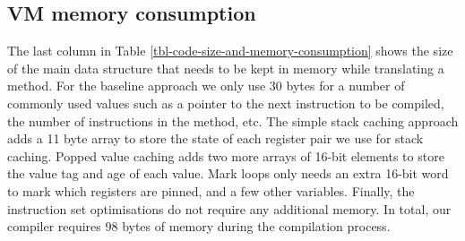 \subsection{VM memory consumption} The last column in Table \ref{tbl-code-size-and-memory-consumption} shows the size of the main data structure that needs to be kept in memory while translating a method. For the baseline approach we only use 30 bytes for a number of commonly used values such as a pointer to the next instruction to be compiled, the number of instructions in the method, etc. The simple stack caching approach adds a 11 byte array to store the state of each register pair we use for stack caching. Popped value caching adds two more arrays of 16-bit elements to store the value tag and age of each value. Mark loops only needs an extra 16-bit word to mark which registers are pinned, and a few other variables. Finally, the instruction set optimisations do not require any additional memory. In total, our compiler requires 98 bytes of memory during the compilation process.


